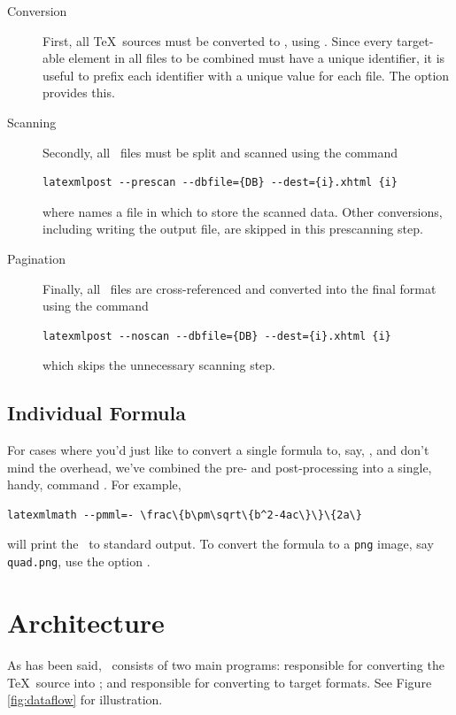 \documentclass{book}
\begin{document}
\begin{description}
\item[Conversion] First, all \TeX\ sources must be converted
   to \XML, using .  Since every target-able element
   in all files to be combined must have a unique identifier, it is useful to
   prefix each identifier with a unique value for each file. 
   The  option  provides this.

 \item[Scanning] Secondly, all \XML\ files must be split and scanned using
  the command
  \begin{lstlisting}[style=shell]
   latexmlpost --prescan --dbfile={DB} --dest={i}.xhtml {i}
  \end{lstlisting}
  where  names a file in which to store the scanned data.
  Other conversions, including writing the output file, are skipped in this prescanning step.
 
 \item[Pagination] Finally, all \XML\ files are cross-referenced and converted into
   the final format using the command
   \begin{lstlisting}[style=shell]
     latexmlpost --noscan --dbfile={DB} --dest={i}.xhtml {i}
   \end{lstlisting}
   which skips the unnecessary scanning step.
\end{description}

\section{Individual Formula}\label{usage.latexmlmath}
For cases where you'd just like to convert a single formula to, say, \MathML,
and don't mind the overhead, we've combined the pre- and post-processing into
a single, handy, command .  For example,
\begin{lstlisting}[style=shell]
  latexmlmath --pmml=- \frac\{b\pm\sqrt\{b^2-4ac\}\}\{2a\}
\end{lstlisting}
will print the \MathML\ to standard output.  
To convert the formula to a \texttt{png} image, say \texttt{quad.png},
use the option .

\chapter{Architecture}\label{architecture}
As has been said, \LaTeXML\ consists of two main programs:
 responsible for converting the \TeX\ source into \XML;
and  responsible for converting to target formats.
See Figure \ref{fig:dataflow} for illustration.
\end{document}

